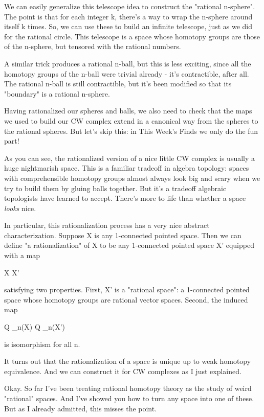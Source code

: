 We can easily generalize this telescope idea to construct the
"rational n-sphere".  The point is that for each integer k,
there's a way to wrap the n-sphere around itself k times.  So, we can
use these to build an infinite telescope, just as we did for the
rational circle.  This telescope is a space whose homotopy groups are
those of the n-sphere, but tensored with the rational numbers.

A similar trick produces a rational n-ball, but this is less exciting,
since all the homotopy groups of the n-ball were trivial already -
it's contractible, after all.  The rational n-ball is still
contractible, but it's been modified so that its "boundary"
is a rational n-sphere.

Having rationalized our spheres and balls, we also need to check 
that the maps we used to build our CW complex extend in a canonical 
way from the spheres to the rational spheres.  But let's skip
this: in This Week's Finds we only do the fun part!

As you can see, the rationalized version of a nice little CW complex
is usually a huge nightmarish space.  This is a familiar tradeoff in
algebra topology: spaces with comprehensible homotopy groups almost
always look big and scary when we try to build them by gluing balls
together.  But it's a tradeoff algebraic topologists have learned to
accept.  There's more to life than whether a space \emph{looks} nice.

In particular, this rationalization process has a very nice abstract
characterization.  Suppose X is any 1-connected pointed space.  Then
we can define "a rationalization" of X to be any 1-connected pointed
space X' equipped with a map

X \to  X' 

satisfying two properties.  First, X' is a "rational space": a
1-connected pointed space whose homotopy groups are rational 
vector spaces.  Second, the induced map
   
Q \otimes  \pi _{n}(X) \to  Q \otimes  \pi _{n}(X')

is isomorphism for all n. 

It turns out that the rationalization of a space is unique up to weak
homotopy equivalence.  And we can construct it for CW complexes as I
just explained.

Okay.  So far I've been treating rational homotopy theory as the study
of weird "rational" spaces.  And I've showed you how to turn
any space into one of these.  But as I already admitted, this
misses the point.

